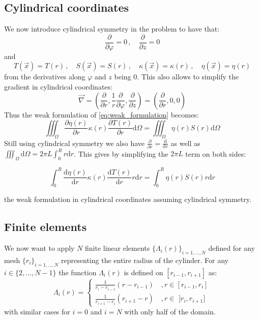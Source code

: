 \subsection{Cylindrical coordinates}
We now introduce cylindrical symmetry in the problem to have that:
\begin{equation}
    \frac{\partial}{\partial \varphi} = 0 \, ,\quad \frac{\partial}{\partial z} = 0
\end{equation}
and
\begin{equation}
    T(\vec{x}) = T(r) \, , \quad S(\vec{x}) = S(r) \, , \quad \kappa(\vec{x}) = \kappa(r) \, , \quad \eta(\vec{x}) = \eta(r)
\end{equation}
from the derivatives along $\varphi$ and $z$ being 0. This also allows to simplify the gradient in cylindrical coordinates:
\begin{equation}
    \vec{\nabla} = \left(\frac{\partial}{\partial r}, \frac{1}{r}\frac{\partial}{\partial \varphi}, \frac{\partial}{\partial z}\right) = \left(\frac{\partial}{\partial r}, 0, 0\right)
\end{equation}
Thus the weak formulation of \autoref{eq:weak_formulation} becomes:
\begin{equation}
    \iiint_\Omega \frac{\partial \eta (r)}{\partial r} \kappa(r) \frac{\partial T(r)}{\partial r} \mathrm{d}\Omega = \iiint_\Omega \eta(r)S(r) \mathrm{d}\Omega
\end{equation}
Still using cylindrical symmetry we also have $\frac{\partial}{\partial r} = \frac{\mathrm{d}}{\mathrm{d}r}$ as well as $\iiint_\Omega \mathrm{d}\Omega = 2\pi L \int_0^R r \mathrm{d}r$. This gives by simplifying the $2\pi L$ term on both sides:

\begin{equation}
    \int_0^R \frac{\mathrm{d} \eta (r)}{\mathrm{d} r} \kappa(r) \frac{\mathrm{d} T(r)}{\mathrm{d} r} r \mathrm{d}r = \int_0^R \eta(r)S(r) r \mathrm{d}r
    \label{eq:formulation_cylindrical}
\end{equation}

the weak formulation in cylindrical coordinates assuming cylindrical symmetry.

\subsection{Finite elements}
We now want to apply $N$ finite linear elements $\{\Lambda_i(r)\}_{i=1,\ldots,N}$ defined for any mesh $\{r_i\}_{i=1,\ldots,N}$ representing the entire radius of the cylinder. For any $i \in \{2,\ldots,N-1\}$ the function $\Lambda_i(r)$ is defined on $[r_{i-1}, r_{i+1}]$ as:
\begin{equation}
    \Lambda_i(r) = \begin{cases}
        \frac{1}{r_i - r_{i-1}}(r - r_{i-1}) \quad , r \in [r_{i-1}, r_i] \\
        \frac{1}{r_{i+1} - r_i}(r_{i+1} - r) \quad , r \in \,\, ]r_i, r_{i+1}]
    \end{cases}
\end{equation}
with similar cases for $i=0$ and $i=N$ with only half of the domain.

